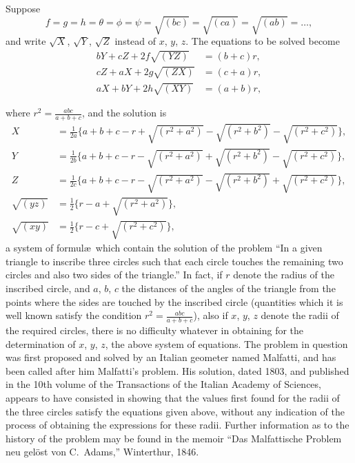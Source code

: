 \documentclass[11pt,a4paper]{article}
\theoremstyle{definition}
\begin{document}
Suppose
\[
f = g = h = \theta = \phi = \psi = \sqrt{(bc)} = \sqrt{(ca)} = \sqrt{(ab)} = \ldots,
\]
and write $\sqrt{X}$, $\sqrt{Y}$, $\sqrt{Z}$ instead of $x$, $y$, $z$. The equations to be solved become
\begin{align*}
bY + cZ + 2f\sqrt{(YZ)} &= (b + c)r, \\
cZ + aX + 2g\sqrt{(ZX)} &= (c + a)r, \\
aX + bY + 2h\sqrt{(XY)} &= (a + b)r,
\end{align*}

\newpage

\setcounter{page}{468}

where $r^{2} = \frac{abc}{a + b + c}$, and the solution is
\begin{align*}
X &= \tfrac{1}{2a}\{a + b + c - r + \sqrt{(r^{2} + a^{2})} - \sqrt{(r^{2} + b^{2})} - \sqrt{(r^{2} + c^{2})}\}, \\
Y &= \tfrac{1}{2b}\{a + b + c - r - \sqrt{(r^{2} + a^{2})} + \sqrt{(r^{2} + b^{2})} - \sqrt{(r^{2} + c^{2})}\}, \\
Z &= \tfrac{1}{2c}\{a + b + c - r - \sqrt{(r^{2} + a^{2})} - \sqrt{(r^{2} + b^{2})} + \sqrt{(r^{2} + c^{2})}\}, \\
\sqrt{(yz)} &= \tfrac{1}{2}\{r - a + \sqrt{(r^{2} + a^{2})}\}, \\
\sqrt{(xy)} &= \tfrac{1}{2}\{r - c + \sqrt{(r^{2} + c^{2})}\},
\end{align*}
a system of formul\ae\ which contain the solution of the problem ``In a given triangle to inscribe three circles such that each circle touches the remaining two circles and also two sides of the triangle.'' In fact, if $r$ denote the radius of the inscribed circle, and $a$, $b$, $c$ the distances of the angles of the triangle from the points where the sides are touched by the inscribed circle (quantities which it is well known satisfy the condition $r^{2} = \frac{abc}{a+b+c}$), also if $x$, $y$, $z$ denote the radii of the required circles, there is no difficulty whatever in obtaining for the determination of $x$, $y$, $z$, the above system of equations. The problem in question was first proposed and solved by an Italian geometer named Malfatti, and has been called after him Malfatti's problem. His solution, dated 1803, and published in the 10th volume of the Transactions of the Italian Academy of Sciences, appears to have consisted in showing that the values first found for the radii of the three circles satisfy the equations given above, without any indication of the process of obtaining the expressions for these radii. Further information as to the history of the problem may be found in the memoir ``Das Malfattische Problem neu gel\"{o}st von C.\ Adams,'' Winterthur, 1846.
\end{document}
